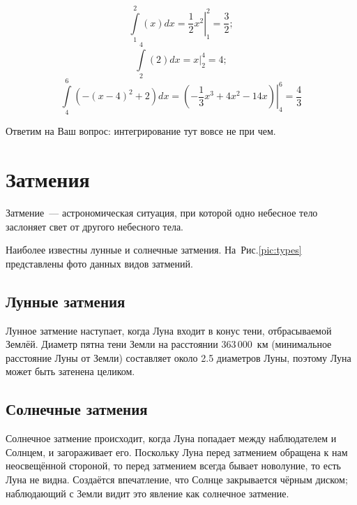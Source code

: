 \documentclass{article}
\begin{document}
    \begin{equation}
    	\int\limits_{1}^{2} (x)dx = \left.\frac{1}{2}x^2 \right|_{1}^{2} = \frac{3}{2};
    \end{equation}
    \begin{equation}
    	\int\limits_{2}^{4} (2)dx = x\big|_{2}^{4} = 4;
    \end{equation}
    \begin{equation}
    	\int\limits_{4}^{6} \left(-\left(x-4\right)^2+2\right)dx = \left.\left(-\frac{1}{3}x^3+4x^2-14x\right)\right|_{4}^{6} = \frac{4}{3}
    \end{equation} \par 
    Ответим на Ваш вопрос: интегрирование тут вовсе не при чем.
    
    \section{Затмения}
    Затмение~--- астрономическая ситуация, при которой одно небесное тело заслоняет свет от другого небесного тела. \par
    Наиболее известны лунные и солнечные затмения. На~Рис.\ref{pic:types} представлены фото данных видов затмений.
    
    \subsection{Лунные затмения}
    Лунное затмение наступает, когда Луна входит в конус тени, отбрасываемой Землёй. Диаметр пятна тени Земли на расстоянии 363\,000~км (минимальное расстояние Луны от Земли) составляет около 2.5 диаметров Луны, поэтому Луна может быть затенена целиком.
    
    \subsection{Солнечные затмения}
    Солнечное затмение происходит, когда Луна попадает между наблюдателем и Солнцем, и загораживает его. Поскольку Луна перед затмением обращена к нам неосвещённой стороной, то перед затмением всегда бывает новолуние, то есть Луна не видна. Создаётся впечатление, что Солнце закрывается чёрным диском; наблюдающий с Земли видит это явление как солнечное затмение.
    
\end{document}
